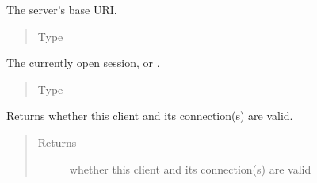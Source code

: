 \documentclass[letterpaper,10pt,english]{sphinxmanual}
\begin{document}
\begin{fulllineitems}

\begin{fulllineitems}
\label{\detokenize{autoapi/pine/client/client/index:pine.client.client.BaseClient.base_uri}}
The server’s base URI.
\begin{quote}\begin{description}
\item[{Type}] \leavevmode
{}

\end{description}\end{quote}

\end{fulllineitems}


\begin{fulllineitems}
\label{\detokenize{autoapi/pine/client/client/index:pine.client.client.BaseClient.session}}
The currently open session, or .
\begin{quote}\begin{description}
\item[{Type}] \leavevmode
{}

\end{description}\end{quote}

\end{fulllineitems}


\begin{fulllineitems}
\label{\detokenize{autoapi/pine/client/client/index:pine.client.client.BaseClient.is_valid}}
Returns whether this client and its connection(s) are valid.
\begin{quote}\begin{description}
\item[{Returns}] \leavevmode
whether this client and its connection(s) are valid


\end{description}
\end{quote}
\end{fulllineitems}
\end{fulllineitems}
\end{document}
